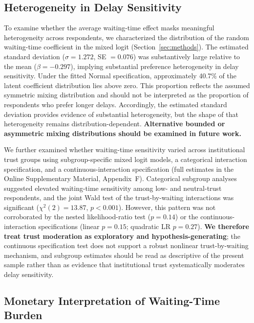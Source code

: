 \documentclass[12pt]{article}
\begin{document}
\clearpage

\subsection{Heterogeneity in Delay Sensitivity}\label{sec:results_het}

To examine whether the average waiting-time effect masks meaningful heterogeneity across respondents, we characterized the distribution of the random waiting-time coefficient in the mixed logit (Section~\ref{sec:methods}). The estimated standard deviation ($\sigma = 1.272$, SE $= 0.076$) was substantively large relative to the mean ($\beta = -0.297$), implying substantial preference heterogeneity in delay sensitivity. Under the fitted Normal specification, approximately 40.7\% of the latent coefficient distribution lies above zero. This proportion reflects the assumed symmetric mixing distribution and should not be interpreted as the proportion of respondents who prefer longer delays. Accordingly, the estimated standard deviation provides evidence of substantial heterogeneity, but the shape of that heterogeneity remains distribution-dependent. \textbf{Alternative bounded or asymmetric mixing distributions should be examined in future work.}

We further examined whether waiting-time sensitivity varied across institutional trust groups using subgroup-specific mixed logit models, a categorical interaction specification, and a continuous-interaction specification (full estimates in the Online Supplementary Material, Appendix~F). Categorical subgroup analyses suggested elevated waiting-time sensitivity among low- and neutral-trust respondents, and the joint Wald test of the trust-by-waiting interactions was significant ($\chi^2(2) = 13.87$, $p < 0.001$). However, this pattern was not corroborated by the nested likelihood-ratio test ($p = 0.14$) or the continuous-interaction specifications (linear $p = 0.15$; quadratic LR $p = 0.27$). \textbf{We therefore treat trust moderation as exploratory and hypothesis-generating}; the continuous specification test does not support a robust nonlinear trust-by-waiting mechanism, and subgroup estimates should be read as descriptive of the present sample rather than as evidence that institutional trust systematically moderates delay sensitivity.

\subsection{Monetary Interpretation of Waiting-Time Burden}
\end{document}
